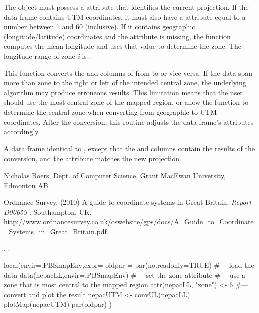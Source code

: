 \documentclass[letterpaper]{book}
\begin{document}
%
\begin{Details}\relax
The object  must possess a  attribute that
identifies the current projection.  If the data frame contains UTM
coordinates, it must also have a  attribute equal to a
number between 1 and 60 (inclusive).  If it contains
geographic (longitude/latitude) coordinates and the  attribute is
missing, the function computes the mean longitude and uses that value
to determine the zone.  The longitude range of zone \emph{i} is
.

This function converts the  and  columns of
 from  to  or vice-versa.  If the
data span more than  zone to the right or left of the intended
central zone, the underlying algorithm may produce erroneous
results. This limitation means that the user should use 
the most central zone of the mapped region, or allow the function to determine
the central zone when converting from geographic to UTM coordinates.
After the conversion, this routine adjusts the data frame's attributes accordingly.
\end{Details}
%
\begin{Value}
A data frame identical to , except that the  and
 columns contain the results of the conversion, and the
 attribute matches the new projection.
\end{Value}
%
\begin{Author}\relax
Nicholas Boers, Dept. of Computer Science, Grant MacEwan University, Edmonton AB
\end{Author}
%
\begin{References}\relax
Ordnance Survey. (2010) A guide to coordinate systems
in Great Britain. \emph{Report D00659} . Southampton, UK. \\{}
\url{http://www.ordnancesurvey.co.uk/oswebsite/gps/docs/A_Guide_to_Coordinate_Systems_in_Great_Britain.pdf}.
\end{References}
%
\begin{SeeAlso}\relax
{},
.
\end{SeeAlso}
%
\begin{Examples}
\begin{ExampleCode}
local(envir=.PBSmapEnv,expr={
  oldpar = par(no.readonly=TRUE)
  #--- load the data
  data(nepacLL,envir=.PBSmapEnv)
  #--- set the zone attribute
  #--- use a zone that is most central to the mapped region
  attr(nepacLL, "zone") <- 6
  #--- convert and plot the result
  nepacUTM <- convUL(nepacLL)
  plotMap(nepacUTM)
  par(oldpar)
})
\end{ExampleCode}
\end{Examples}
\end{document}
